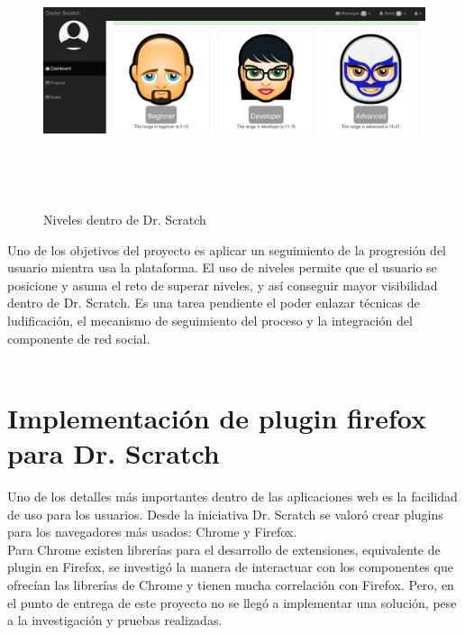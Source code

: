 \documentclass[a4paper, 12pt]{book}
\begin{document}
\begin{figure}[h]
  \centering
	\graphicspath{{img/}}
  \includegraphics[bb=0 0 800 600, width=18cm, height=8cm, keepaspectratio]{niveles.png}
	\caption{Niveles dentro de Dr. Scratch}
  \label{figura:foro_hilos}
\end{figure}

Uno de los objetivos del proyecto es aplicar un seguimiento de la progresión del 
usuario mientra usa la plataforma. El uso de niveles permite que el usuario se posicione
y asuma el reto de superar niveles, y así conseguir mayor visibilidad dentro de Dr. 
Scratch. Es una tarea pendiente el poder enlazar técnicas de ludificación, el mecanismo
de seguimiento del proceso y la integración del componente de red social. \\ \\


\section{Implementación de plugin firefox para Dr. Scratch}
\label{sec:servidor}

Uno de los detalles más importantes dentro de las aplicaciones web es la facilidad de 
uso para los usuarios. Desde la iniciativa Dr. Scratch se valoró crear plugins para
los navegadores más usados: Chrome y Firefox. \\

Para Chrome existen librerías para el desarrollo de extensiones, equivalente de plugin
en Firefox, se investigó la manera de interactuar con los componentes que ofrecían
las librerías de Chrome y tienen mucha correlación con Firefox. Pero, en el punto
de entrega de este proyecto no se llegó a implementar una solución, pese a la
investigación y pruebas realizadas. \\
\end{document}
